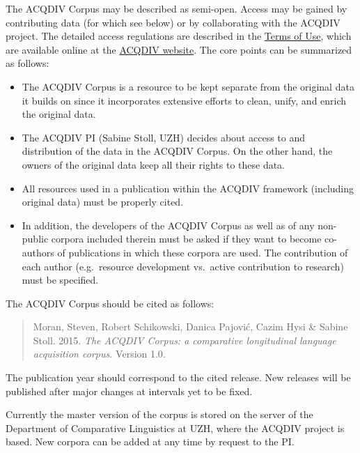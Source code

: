 \documentclass[a4paper, 11pt]{book}
\begin{document}
The ACQDIV Corpus may be described as semi-open. Access may be gained by contributing data (for which see below) or by collaborating with the ACQDIV project. The detailed access regulations are described in the \href{http://www.acqdiv.uzh.ch/dam/jcr:c7318751-f531-43a8-9dbd-b48eee950a4c/terms_of_use_for_the_acqdiv_corpus.pdf}{Terms of Use}, which are available online at the \href{http://www.acqdiv.uzh.ch/en/resources.html}{ACQDIV website}. The core points can be summarized as follows: 

\begin{itemize}
	\item The ACQDIV Corpus is a resource to be kept separate from the original data it builds on since it incorporates extensive efforts to clean, unify, and enrich the original data.
	\item The ACQDIV PI (Sabine Stoll, UZH) decides about access to and distribution of the data in the ACQDIV Corpus. On the other hand, the owners of the original data keep all their rights to these data. 
	\item All resources used in a publication within the ACQDIV framework (including original data) must be properly cited.
	\item In addition, the developers of the ACQDIV Corpus as well as of any non-public corpora included therein must be asked if they want to become co-authors of publications in which these corpora are used. The contribution of each author (e.g.\ resource development vs.\ active contribution to research) must be specified. 
\end{itemize}

\noindent The ACQDIV Corpus should be cited as follows: 

\begin{quote}
Moran, Steven, Robert Schikowski, Danica Pajović, Cazim Hysi \& Sabine Stoll. 2015. \emph{The ACQDIV Corpus: a comparative longitudinal language acquisition corpus.} Version 1.0. %
\end{quote}

The publication year should correspond to the cited release. New releases will be published after major changes at intervals yet to be fixed. 

Currently the master version of the corpus is stored on the server of the Department of Comparative Linguistics at UZH, where the ACQDIV project is based. New corpora can be added at any time by request to the PI. 

\end{document}

